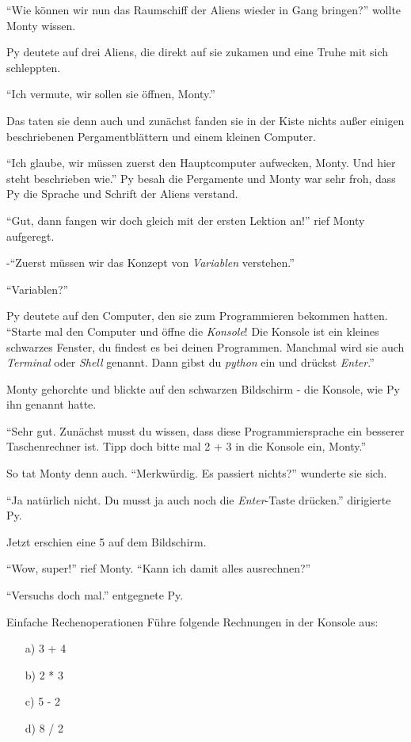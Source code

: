 \documentclass[a5paper,12pt,twoside,openright]{scrbook}
\begin{document}
"`Wie können wir nun das Raumschiff der Aliens wieder in Gang bringen?"' wollte Monty wissen.

Py deutete auf drei Aliens, die direkt auf sie zukamen und eine Truhe mit sich schleppten.

"`Ich vermute, wir sollen sie öffnen, Monty."' 

Das taten sie denn auch und zunächst fanden sie in der Kiste nichts au{\ss}er einigen beschriebenen Pergamentblättern und einem kleinen Computer.

"`Ich glaube, wir müssen zuerst den Hauptcomputer aufwecken, Monty. Und hier steht beschrieben wie."'
Py besah die Pergamente und Monty war sehr froh, dass Py die Sprache und Schrift der Aliens verstand.

"`Gut, dann fangen wir doch gleich mit der ersten Lektion an!"' rief Monty aufgeregt.

-"`Zuerst müssen wir das Konzept von \emph{Variablen} verstehen."'  

"`Variablen?"'

Py deutete auf den Computer, den sie zum Programmieren bekommen hatten.
"`Starte mal den Computer und öffne die \emph{Konsole}! Die Konsole ist ein kleines schwarzes Fenster, du findest es bei deinen Programmen.
 Manchmal wird sie auch \emph{Terminal} oder \emph{Shell} genannt. Dann gibst du \emph{python} ein und drückst \emph{Enter}."'

Monty gehorchte und blickte auf den schwarzen Bildschirm - die Konsole, wie Py ihn genannt hatte.

"`Sehr gut. Zunächst musst du wissen, dass diese Programmiersprache ein besserer Taschenrechner ist. 
Tipp doch bitte mal 2 + 3 in die Konsole ein, Monty."'

So tat Monty denn auch.
"`Merkwürdig. Es passiert nichts?"' wunderte sie sich.

"`Ja natürlich nicht. Du musst ja auch noch die \emph{Enter}-Taste drücken."' dirigierte Py.

Jetzt erschien eine 5 auf dem Bildschirm.

"`Wow, super!"' rief Monty. "`Kann ich damit alles ausrechnen?"'

"`Versuchs doch mal."' entgegnete Py.

\begin{aufgabe}{Einfache Rechenoperationen}
Führe folgende Rechnungen in der Konsole aus:
\begin{itemize}
 \item[a)] 3 + 4
 \item[b)] 2 * 3
 \item[c)] 5 - 2
 \item[d)] 8 / 2 
\end{itemize}
\end{aufgabe}
\end{document}

